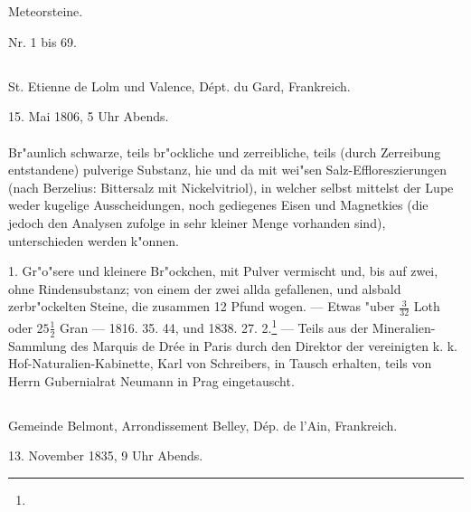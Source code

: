 \documentclass[a4paper, 11pt, oneside, polutonikogreek, german]{article}
\begin{document}
\section{}
\begin{center}
{\LARGE Meteorsteine.}

Nr. 1 bis 69.
\end{center}
\subsection{}
\begin{center}
St. Etienne de Lolm und Valence, Dépt. du Gard, Frankreich.

15. Mai 1806, 5 Uhr Abends.
\end{center}
\paragraph{}
Br"aunlich schwarze, teils br"ockliche und zerreibliche, teils (durch Zerreibung entstandene) pulverige Substanz, hie und da mit wei"sen Salz-Effloreszierungen (nach Berzelius: Bittersalz mit Nickelvitriol), in welcher selbst mittelst der Lupe weder kugelige Ausscheidungen, noch gediegenes Eisen und Magnetkies (die jedoch den Analysen zufolge in sehr kleiner Menge vorhanden sind), unterschieden werden k"onnen.

1. Gr"o"sere und kleinere Br"ockchen, mit Pulver vermischt und, bis auf zwei, ohne Rindensubstanz; von einem der zwei allda gefallenen, und alsbald zerbr"ockelten Steine, die zusammen 12 Pfund wogen. --- Etwas "uber $\mathfrak{\frac{3}{32}}$ Loth oder $\mathfrak{25\frac{1}{2}}$ Gran --- 1816. 35. 44, und 1838. 27. 2.\footnote{} --- Teils aus der Mineralien-Sammlung des Marquis de Drée in Paris durch den Direktor der vereinigten k. k. Hof-Naturalien-Kabinette, Karl von Schreibers, in Tausch erhalten, teils von Herrn Gubernialrat Neumann in Prag eingetauscht.
\subsection{}
\begin{center}
Gemeinde Belmont, Arrondissement Belley, Dép. de l’Ain, Frankreich.

13. November 1835, 9 Uhr Abends.
\end{center}
\end{document}
